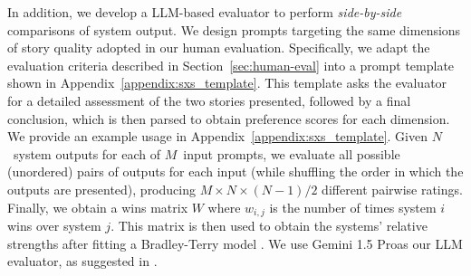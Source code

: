 \documentclass{article}
\newcommand{\reinald}[1]{{\textcolor{teal}{\bf{Reinald:} \emph{#1}}}}
\begin{document}
In addition, we develop a LLM-based evaluator
\citep{liusie2023zero,liu2024aligning,zheng2024judging,bohnet2024long}
to perform \emph{side-by-side} comparisons of system output. We design
prompts targeting the same dimensions of story quality adopted in our
human evaluation.
%
%
%
%
%
%
Specifically, we adapt the  evaluation criteria described in Section~\ref{sec:human-eval} into a prompt template shown in Appendix~\ref{appendix:sxs_template}.
This template asks the evaluator for a detailed assessment of the two stories presented, followed by a final conclusion, which is then parsed to obtain preference scores for each dimension.
We provide an example usage in Appendix~\ref{appendix:sxs_template}.
Given $N$~system outputs for each of $M$~input prompts, we evaluate all possible (unordered) pairs of outputs for each input (while shuffling the order in which the outputs are presented), producing $M \times N \times (N-1)/2$ different pairwise ratings.
Finally, we obtain a wins matrix $W$ where $w_{i,j}$ is the number of times system $i$ wins over system $j$. This matrix is then used to obtain the systems' relative strengths after fitting a Bradley-Terry model \citep{bradley1952rank}.
We use Gemini 1.5 Pro\footnotemark[4] as our LLM evaluator, as suggested in \cite{bohnet2024long}. 
\end{document}
